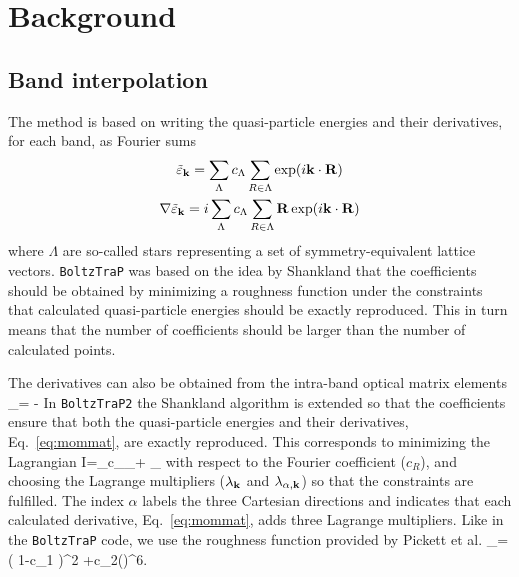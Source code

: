 \documentclass[final,5p,times,twocolumn,sort&compress]{elsarticle}
\newcounter{bla}
\begin{document}
\section{Background}
\subsection{Band interpolation}
The method is based on writing the quasi-particle energies and their derivatives, for each band, as Fourier sums
\begin{gather}
\tilde{\varepsilon}_{\bf k}=\sum_\Lambda c_\Lambda\sum_{R\in\Lambda} \exp(i{\bf k}\cdot{\bf R})
\label{eq:Fourier} \\
\nabla \tilde{\varepsilon}_{\bf k}=i\sum_\Lambda c_\Lambda\sum_{R\in\Lambda} {\bf R} \exp(i{\bf k}\cdot{\bf R})
\label{eq:dFourier} 
\end{gather}
where $\Lambda$ are so-called stars representing a set of symmetry-equivalent lattice vectors. 
\texttt{BoltzTraP} was based on the idea by Shankland \cite{Euwema_PR69,Shankland_IJQC71,Koelling_JComP86} that the coefficients should be obtained by minimizing a roughness function under the constraints that calculated quasi-particle energies should be exactly reproduced. This in turn means that the number of coefficients should be larger than the number of calculated points.

The derivatives can also be obtained from the intra-band optical matrix elements \cite{Scheidemantel_PRB03,WOPTIC}
\beq
\nabla \varepsilon_\bk = -
\label{eq:mommat}
\eeq
In \texttt{BoltzTraP2} the Shankland algorithm\cite{Euwema_PR69,Shankland_IJQC71,Koelling_JComP86} is extended so that the coefficients ensure that both the quasi-particle energies and their derivatives, Eq.~\eqref{eq:mommat}, are exactly reproduced.
This corresponds to minimizing the Lagrangian
\beq
  I=\half\sum_\bR c_\bR \rho_\bR + 
  \sum_\bk \left[\lambda_\bk \left(\varepsilon_\bk-\tilde{\varepsilon}_\bk\right)
 + \sum_\alpha\lambda_{\alpha,\bk} \nabla_\alpha \left(\varepsilon_\bk- \tilde{\varepsilon}_\bk\right)\right]
\label{eq:Lagrangian}
\eeq
with respect to the Fourier coefficient ($c_{R}$), and choosing the Lagrange multipliers ($\lambda_{\bf k}$ and $\lambda_{\alpha,{\bf k}}$) so that the constraints are fulfilled. The index $\alpha$ labels the three Cartesian directions and indicates that each calculated derivative, Eq.~\eqref{eq:mommat}, adds three Lagrange multipliers.  
Like in the \texttt{BoltzTraP} code, we use the roughness function provided by Pickett et al. \cite{Pickett_PRB88}
\beq
\rho_\bR=\left( 1-c_1 \right)^2 +c_2\left(\right)^6.
\label{eq:Pickett}
\eeq
\end{document}
